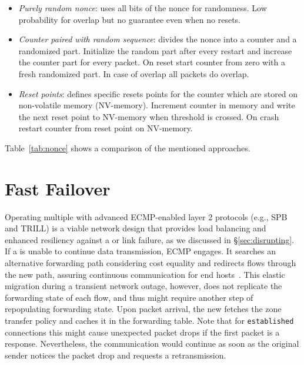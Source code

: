 \begin{itemize}
	\item \textit{Purely random nonce}: uses all bits of the nonce for randomness. Low
	      probability for overlap but no guarantee even when no resets.
	\item \textit{Counter paired with random sequence}: divides the nonce into a counter
	      and a randomized part. Initialize the random part after every restart and increase
	      the counter part for every packet. On reset start counter from zero with a fresh
	      randomized part. In case of overlap all packets do overlap.
	\item \textit{Reset points}: defines specific resets points for the counter which are
	      stored on non-volatile memory (NV-memory). Increment counter in memory and write the
	      next reset point to NV-memory when threshold is crossed. On crash restart counter from
	      reset point on NV-memory.
\end{itemize}

Table~\ref{tab:nonce} shows a comparison of the mentioned approaches.



\section{Fast Failover}
\label{sec:ecmp}
Operating multiple \tps with advanced ECMP-enabled layer 2 protocols (e.g., SPB and 
TRILL) is a viable network design that provides load balancing and enhanced resiliency 
against a \tp or link failure, as we discussed in \S\ref{sec:disrupting}. 
If a \tp is unable to continue data transmission, ECMP engages. It searches an alternative
forwarding path considering cost equality and redirects flows through the new path, assuring
continuous communication for end hosts~\cite{rfc6754}. 
This elastic migration during a transient network outage, however, does not replicate the
forwarding state of each flow, and thus might require another step of repopulating  
forwarding state. Upon packet arrival, the new \tp fetches the zone transfer policy
and caches it in the forwarding table. Note that for \texttt{established} connections this might
cause unexpected packet drops if the first packet is a response. Nevertheless, the 
communication would continue as soon as the original sender notices the packet drop 
and requests a retransmission. 


